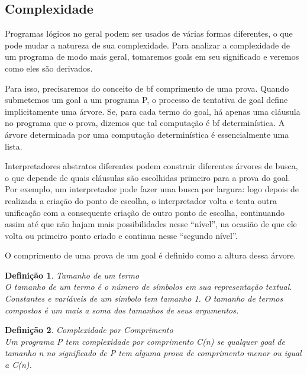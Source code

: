 \documentclass{article}
\newtheorem{definition}{Definição}[section]
\theoremstyle{remark}
\begin{document}
\subsection{Complexidade}

Programas lógicos no geral podem ser usados de várias formas diferentes, o que pode mudar a natureza de sua complexidade. Para analizar a complexidade de um programa de modo mais geral, tomaremos goals em seu significado e veremos como eles são derivados.

Para isso, precisaremos do conceito de {bf comprimento de uma prova}. Quando submetemos um goal a um programa P, o processo de tentativa de goal define implicitamente uma árvore. Se, para cada termo do goal, há apenas uma cláusula no programa que o prova, dizemos que tal computação é {bf determinística}. A árvore determinada por uma computação determinística é essencialmente uma lista.

Interpretadores abstratos diferentes podem construir diferentes árvores de busca, o que depende de quais cláusulas são escolhidas primeiro para a prova do goal. Por exemplo, um interpretador pode fazer uma busca por largura: logo depois de realizada a criação do ponto de escolha, o interpretador volta e tenta outra unificação com a consequente criação de outro ponto de escolha, continuando assim até que não hajam mais possibilidades nesse ``nível'', na ocasião de que ele
volta ou primeiro ponto criado e continua nesse ``segundo nível''.

O comprimento de uma prova de um goal é definido como a altura dessa árvore.

\begin{definition}{Tamanho de um termo}
  \\ O tamanho de um termo é o número de símbolos em sua representação textual. Constantes e variáveis de um símbolo tem tamanho 1. O tamanho de termos compostos é um mais a soma dos tamanhos de seus argumentos.
\end{definition}

\begin{definition}{Complexidade por Comprimento}
  \\ Um programa P tem complexidade por comprimento C(n) se qualquer goal de tamanho n no significado de P tem alguma prova de comprimento menor ou igual a C(n).
\end{definition}
\end{document}
